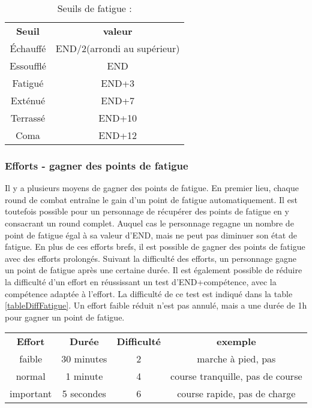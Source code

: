 \documentclass[10pt,a4paper,twocolumn]{book}
\begin{document}
\begin{table}
\caption{ Seuils de fatigue :}
\label{tableSeuilsFatigue}
\begin{center}
\begin{tabular}{cc}
\textbf{Seuil} & \textbf{valeur} \\
   Échauffé & END/2(arrondi au supérieur)  \\
   Essoufflé & END  \\
   Fatigué & END+3 \\
   Exténué & END+7 \\
   Terrassé & END+10 \\
   Coma & END+12 \\
\end{tabular}
\end{center}
\end{table}
\subsubsection{Efforts - gagner des points de fatigue}
Il y a plusieurs moyens de gagner des points de fatigue.
En premier lieu, chaque round de combat entraîne le gain d’un point de fatigue automatiquement. Il est toutefois possible pour un personnage de récupérer des points de fatigue en y consacrant un round complet. Auquel cas le personnage regagne un nombre de point de fatigue égal à sa valeur d’END, mais ne peut pas diminuer son état de fatigue.
En plus de ces efforts brefs, il est possible de gagner des points de fatigue avec des efforts prolongés.
Suivant la difficulté des efforts, un personnage gagne un point de fatigue après une certaine durée. Il est également possible de réduire la difficulté d’un effort en réussissant un test d’END+compétence, avec la compétence adaptée à l’effort. La difficulté de ce test est indiqué dans la table \ref{tableDiffFatigue}. Un effort faible réduit n’est pas annulé, mais a une durée de 1h pour gagner un point de fatigue.
\begin{table*}
\caption{ Réduire un effort :}
\label{tableDiffFatigue}
\begin{center}
\begin{tabular}{cccc}
\textbf{Effort} & \textbf{Durée} & \textbf{Difficulté} &\textbf{exemple} \\
   faible & 30 minutes & 2  & marche à pied, pas\\
   normal & 1 minute & 4  & course tranquille, pas de course\\
   important & 5 secondes & 6 & course rapide, pas de charge\\
\end{tabular}
\end{center}
\end{table*}
\end{document}
